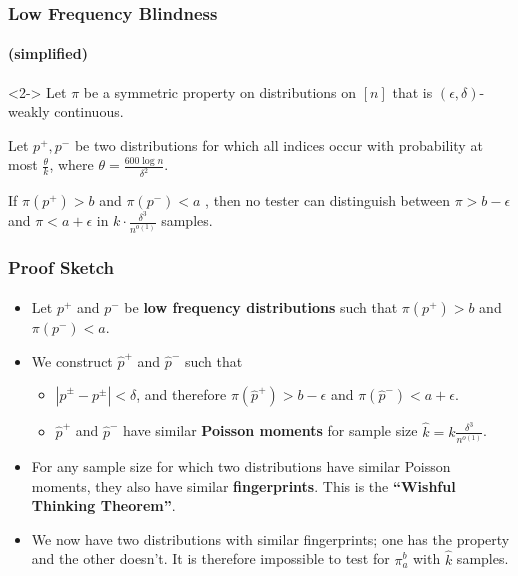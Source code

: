 \documentclass{beamer}
\begin{document}
\begin{frame}
  \frametitle{Low Frequency Blindness} \framesubtitle{(simplified)}
  \begin{theorem}<2->
    Let $\pi$ be a symmetric property on distributions on $[n]$ that
    is $(\epsilon,\delta)$-weakly continuous.

    Let $p^+,p^-$ be two distributions for which all indices occur
    with probability at most $\frac{\theta}{k}$, where
    $\theta=\frac{600\log n}{\delta^2}$.

    If $\pi(p^+)>b$ and $\pi(p^-)<a$ , then no tester can distinguish
    between $\pi>b-\epsilon$ and $\pi<a+\epsilon$ in $k\cdot
    \frac{\delta^3}{n^{o(1)}}$ samples.
  \end{theorem}
\end{frame}


\begin{frame}
  \frametitle{Proof Sketch} \framesubtitle{}

  \begin{itemize}
  \item<1-> Let $p^+$ and $p^-$ be {\bf low frequency distributions}
    such that $\pi(p^+)>b$ and $\pi(p^-)<a$.
  \item<2-> We construct $\hat{p}^+$ and $\hat{p}^-$ such that
    \begin{itemize}
    \item<3-> $|\hat{p}^\pm-p^\pm|<\delta$, and therefore
      $\pi(\hat{p}^+)>b-\epsilon$ and
      $\pi(\hat{p}^-)<a+\epsilon$.
    \item<4->$\hat{p}^+$ and $\hat{p}^-$ have similar {\bf Poisson
        moments} for sample size $\hat{k}=k\frac{\delta^3}{n^{o(1)}}$.
    \end{itemize}
  \item<5-> For any sample size for which two distributions have similar
    Poisson moments, they also have similar {\bf fingerprints}. This
    is the {\bf ``Wishful Thinking Theorem''}.
  \item<6-> We now have two distributions with similar fingerprints;
    one has the property and the other doesn't. It is therefore
    impossible to test for $\pi_a^b$ with $\hat{k}$ samples.
  \end{itemize}

\end{frame}
\end{document}
